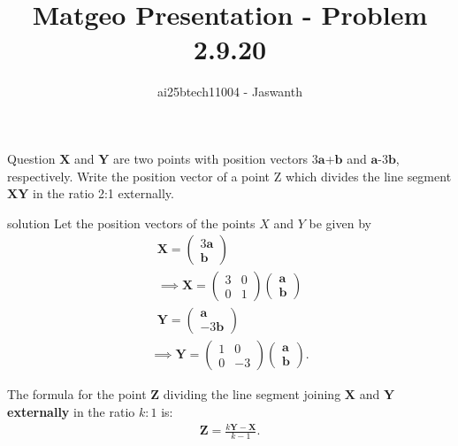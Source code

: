\documentclass{beamer}
\title{Matgeo Presentation - Problem 2.9.20}
\author{ai25btech11004 - Jaswanth}
\numberwithin{equation}{section}
\theoremstyle{remark}
\newcommand{\myvec}[1]{\ensuremath{\begin{pmatrix}#1\end{pmatrix}}}
\let\vec\mathbf
\begin{document}
\frame{\titlepage}
\begin{frame}{Question}
$\vec{X}$ and  $\vec{Y}$ are two points with position vectors $3\vec{a}$+$\vec{b}$  and  $\vec{a}$-$3\vec{b}$, respectively. Write the position vector of a point Z  which divides the line segment  $\vec{XY}$ in the ratio 2:1 externally.\\
\end{frame}
\begin{frame}{solution}
Let the position vectors of the points $X$ and $Y$ be given by
\begin{align}
    \vec{X}=\myvec{3\vec{a}\\[6pt]
    \vec{b}}\\
  \implies  \vec{X} = \myvec{3 & 0 \\ 
        0 & 1}
\myvec{\vec{a} \\ \vec{b}}\\
 \vec{Y}=\myvec{\vec{a}\\[6pt]
    -3\vec{b}}
\end{align}
\begin{align}
\implies \vec{Y} = 
\myvec{1 & 0 \\ 
     0 & -3}
\myvec{\vec{a} \\ \vec{b}}.
\end{align}

\vspace{1em}

The formula for the point $\mathbf{Z}$ dividing the line segment joining $\vec{X}$ and $\vec{Y}$ \textbf{externally} in the ratio $k:1$ is:
\begin{align}
\vec{Z} = \frac{k\vec{Y} - \vec{X}}{k - 1}.
\end{align}
\end{frame}
\end{document}

